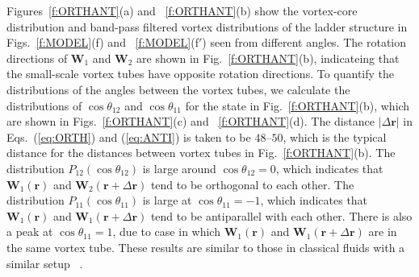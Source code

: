 \documentclass[aps,onecolumn,pra,longbibliography]{revtex4}
\begin{document}
	Figures~\ref{f:ORTHANT}(a) and ~\ref{f:ORTHANT}(b) show the vortex-core distribution
	and band-pass filtered vortex distributions of the ladder structure in Figs.~\ref{f:MODEL}(f)
	and ~\ref{f:MODEL}(f$'$) seen from different angles.
	The rotation directions of ${\bm W}_1$ and ${\bm W}_2$ are shown in Fig.~\ref{f:ORTHANT}(b),
	indicateing that the small-scale vortex tubes have opposite rotation directions.
	To quantify the distributions of the angles between the vortex tubes,
	we calculate the distributions of $\cos \theta_{12}$ and $\cos \theta_{11}$ for
	the state in Fig.~\ref{f:ORTHANT}(b),
	which are shown in Figs.~\ref{f:ORTHANT}(c) and ~\ref{f:ORTHANT}(d).
	The distance $|\Delta\bm{r}|$ in Eqs.~(\ref{eq:ORTH}) and (\ref{eq:ANTI})
	is taken to be $48$--$50$, which is the typical distance
	for the distances between vortex tubes in Fig.~\ref{f:ORTHANT}(b).
	The distribution $P_{12}(\cos \theta_{12})$ is large around $\cos \theta_{12}=0$,
	which indicates that $\bm{W}_1(\bm{r})$ and $\bm{W}_2(\bm{r}+\Delta\bm{r})$
	tend to be orthogonal to each other.
	The distribution $P_{11}(\cos\theta_{11})$ is large at $\cos\theta_{11}=-1$,
	which indicates that $\bm{W}_1(\bm{r})$ and $\bm{W}_1(\bm{r}+\Delta\bm{r})$
	tend to be antiparallel with each other.
	There is also a peak at $\cos\theta_{11}=1$, due to case in which
	$\bm{W}_1(\bm{r})$ and $\bm{W}_1(\bm{r}+\Delta\bm{r})$ are in the same
	vortex tube.
	These results are similar to those in classical fluids with a similar setup
	~\cite{S.Goto2}.
\end{document}
